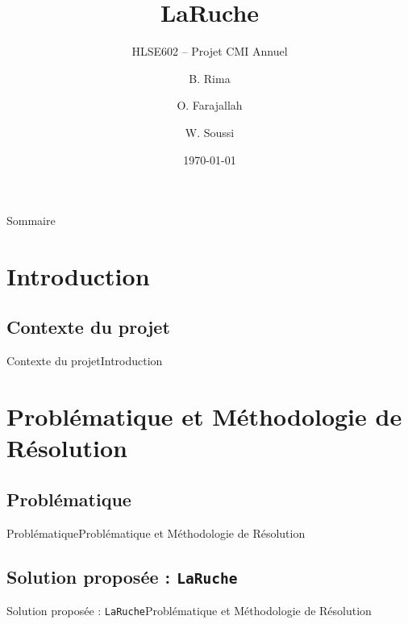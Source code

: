 \documentclass{beamer}
\title{LaRuche}
\subtitle{HLSE602 -- Projet CMI Annuel}
\author{B. Rima \and O. Farajallah \and W. Soussi}
\institute[UM]{L3 CMI Informatique}
\date{\today}
\begin{document}
\begin{frame}
\titlepage
\end{frame}
\begin{frame}{Sommaire}
\tableofcontents
\end{frame}
\section{Introduction}
\subsection{Contexte du projet}
\begin{frame}{Contexte du projet}{Introduction}
\end{frame}

\section{Problématique et Méthodologie de Résolution}
\subsection{Problématique}
\begin{frame}{Problématique}{Problématique et Méthodologie de Résolution}
\end{frame}

\subsection{Solution proposée : \texttt{LaRuche}}
\begin{frame}{Solution proposée : \texttt{LaRuche}}{Problématique et Méthodologie de Résolution}
\end{frame}
\end{document}
